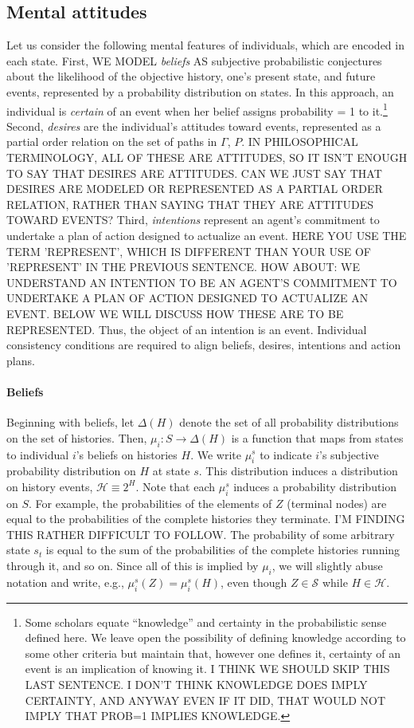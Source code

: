 \documentclass[
11pt,
titlepage,
reqno,
]{article}%
\theoremstyle{definition}
\begin{document}
	\subsection{Mental attitudes\label{sec:attitudes}}
	Let us consider the following mental features of individuals, which are encoded in each state. 
	First, WE MODEL \textit{beliefs} AS subjective probabilistic conjectures about the likelihood of the objective history, one's present state, and future events, represented by a probability distribution on states. 
	In this approach, an individual is \textit{certain} of an event when her belief assigns probability = 1 to it.\footnote
	{
		Some scholars equate ``knowledge'' and certainty in the probabilistic sense defined here. 
		We leave open the possibility of defining knowledge according to some other criteria but maintain that, however one defines it, certainty of an event is an implication of knowing it. 
		I THINK WE SHOULD SKIP THIS LAST SENTENCE. I DON'T THINK KNOWLEDGE DOES IMPLY CERTAINTY, AND ANYWAY EVEN IF IT DID, THAT WOULD NOT IMPLY THAT PROB=1 IMPLIES KNOWLEDGE.
	} 
	Second, \textit{desires} are the individual's attitudes toward events, represented as a partial order relation on the set of paths in $\Gamma$, $P$. 
	IN PHILOSOPHICAL TERMINOLOGY, ALL OF THESE ARE ATTITUDES, SO IT ISN'T ENOUGH TO SAY THAT DESIRES ARE ATTITUDES. CAN WE JUST SAY THAT DESIRES ARE MODELED OR REPRESENTED AS A PARTIAL ORDER RELATION, RATHER THAN SAYING THAT THEY ARE ATTITUDES TOWARD EVENTS? 
	Third, \textit{intentions} represent an agent's commitment to undertake a plan of action designed to actualize an event. 
	HERE YOU USE THE TERM 'REPRESENT', WHICH IS DIFFERENT THAN YOUR USE OF 'REPRESENT' IN THE PREVIOUS SENTENCE. HOW ABOUT: WE UNDERSTAND AN INTENTION TO BE AN AGENT'S COMMITMENT TO UNDERTAKE A PLAN OF ACTION DESIGNED TO ACTUALIZE AN EVENT. BELOW WE WILL DISCUSS HOW THESE ARE TO BE REPRESENTED. 
	Thus, the object of an intention is an event. Individual consistency conditions are required to align beliefs, desires, intentions and action plans. 
	
	\paragraph*{Beliefs \label{para: beliefs}}
	Beginning with beliefs, let $\Delta(H)$ denote the set of all probability distributions on the set of histories. 
	Then,  $\mu_i:S\rightarrow \Delta(H)$ is a function that maps from states to individual $i$'s beliefs on histories $H$. 
	We write  $\mu_i^s$ to indicate $i$'s subjective probability distribution on $H$ at state $s$.
	This distribution induces a distribution on history events, $\mathcal{H}\equiv 2^H$. 
	Note that each $\mu_i^s$ induces a probability distribution on $S$.
	For example, the probabilities of the elements of $Z$ (terminal nodes) are equal to the probabilities of the complete histories they terminate. 
	I'M FINDING THIS RATHER DIFFICULT TO FOLLOW. 
	The probability of some arbitrary state $s_t$ is equal to the sum of the probabilities of the complete histories running through it, and so on.
	Since all of this is implied by $\mu_i$, we will slightly abuse notation and write, e.g.,  $\mu_i^s(Z)=\mu_i^s(H)$, even though $Z\in \mathcal{S}$ while $H\in \mathcal{H}$.
	
\end{document}
